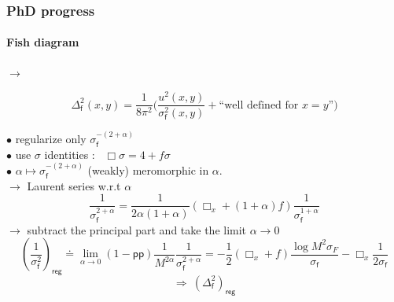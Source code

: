 \documentclass[9pt]{beamer}
\newcommand{\pp}{\mathsf{pp}} %
\newcommand{\fsf}{\mathsf{f}}
\begin{document}
\begin{frame}

\frametitle{PhD progress}
\framesubtitle{Fish diagram}

\vspace*{4pt}

\begin{minipage}{0.2\linewidth}
\centering
\begin{figure}
\end{figure}
\end{minipage}
\hspace*{-8pt}
$\longrightarrow$
\hspace{5pt}
\begin{minipage}{0.7\linewidth}
\vspace*{-12pt}
\begin{equation*}
\Delta_\fsf^2(x,y) = \frac{1}{8 \pi^2} \bigg( \frac{u^2(x,y)}{\sigma_\fsf^2(x,y)} +  
\mbox{``well defined for $x=y$''}
\bigg)
\end{equation*}
\end{minipage}

\vspace*{10pt}

$\bullet$ regularize only $\sigma_\fsf^{-(2+\alpha)}$ \\

$\bullet$ use $\sigma$ identities : \ $ \Box \sigma = 4 + f \sigma $ \\
 
$\bullet$ $\alpha \mapsto \sigma_\fsf^{-(2+\alpha)}$ (weakly) meromorphic in $\alpha$. \\
\quad $\to$ Laurent series w.r.t $\alpha$ \\[-10pt]
\begin{equation*}
\frac{1}{\sigma_\fsf^{2+\alpha}}=\frac{1}{2\alpha(1+\alpha)}\left(\Box_x+(1+\alpha)f\right)\frac{1}{\sigma_\fsf^{1+\alpha}} 
\end{equation*}
\quad $\to$ subtract the principal part and take the limit $\alpha \to 0$ \\[-16pt]
%
\begin{equation*}
\left(\frac{1}{\sigma_\fsf^2}\right)_\mathsf{reg} \doteq \lim_{\alpha\to 0}\left(1-\pp\right)\frac{1}{M^{2\alpha}}\frac{1}{\sigma_\fsf^{2+\alpha}}=-\frac{1}{2}(\Box_x+f)\frac{\log M^2 \sigma_F}{\sigma_\fsf}-\Box_x \frac{1}{2\sigma_\fsf} 
\end{equation*}
%
\vspace*{-10pt}
%
\begin{equation*}
\Longrightarrow \ \left(\Delta_\fsf^{2}\right)_\mathsf{reg} 
\end{equation*}

\end{frame} 
\end{document}
